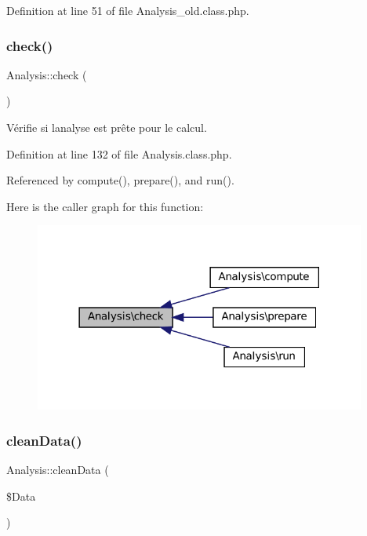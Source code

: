 Definition at line 51 of file Analysis\+\_\+old.\+class.\+php.

\mbox{\label{class_analysis_a25f3a02a783d2e29d3fd4d8c4a03cc4d}} 
\subsubsection{\texorpdfstring{check()}{check()}\hspace{0.1cm}{\footnotesize\ttfamily [2/2]}}
{\footnotesize\ttfamily Analysis\+::check (\begin{DoxyParamCaption}{ }\end{DoxyParamCaption})\hspace{0.3cm}{\ttfamily [protected]}}

Vérifie si l\textquotesingle{}analyse est prête pour le calcul. 

Definition at line 132 of file Analysis.\+class.\+php.



Referenced by compute(), prepare(), and run().

Here is the caller graph for this function\+:\nopagebreak
\begin{figure}[H]
\begin{center}
\leavevmode
\includegraphics[width=309pt]{class_analysis_a25f3a02a783d2e29d3fd4d8c4a03cc4d_icgraph}
\end{center}
\end{figure}
\mbox{\label{class_analysis_a34bdf918d6d336179058ad82cee4d7dd}} 
\subsubsection{\texorpdfstring{clean\+Data()}{cleanData()}}
{\footnotesize\ttfamily Analysis\+::clean\+Data (\begin{DoxyParamCaption}\item[{}]{\$\+Data }\end{DoxyParamCaption})}


